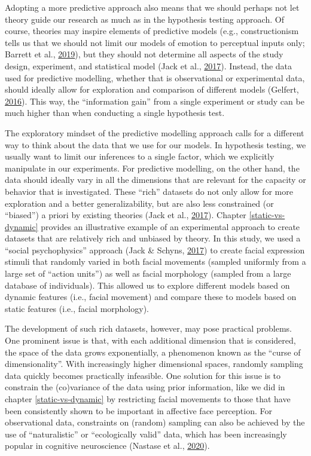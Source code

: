 \documentclass[11pt,american,]{memoir} %
\begin{document}
Adopting a more predictive approach also means that we should perhaps not let theory guide our research as much as in the hypothesis testing approach. Of course, theories may inspire elements of predictive models (e.g., constructionism tells us that we should not limit our models of emotion to perceptual inputs only; Barrett et al., \protect\hyperlink{ref-Barrett2019-bc}{2019}), but they should not determine all aspects of the study design, experiment, and statistical model (Jack et al., \protect\hyperlink{ref-Jack2017-qp}{2017}). Instead, the data used for predictive modelling, whether that is observational or experimental data, should ideally allow for exploration and comparison of different models (Gelfert, \protect\hyperlink{ref-Gelfert2016-hd}{2016}). This way, the ``information gain'' from a single experiment or study can be much higher than when conducting a single hypothesis test.

The exploratory mindset of the predictive modelling approach calls for a different way to think about the data that we use for our models. In hypothesis testing, we usually want to limit our inferences to a single factor, which we explicitly manipulate in our experiments. For predictive modelling, on the other hand, the data should ideally vary in all the dimensions that are relevant for the capacity or behavior that is investigated. These ``rich'' datasets do not only allow for more exploration and a better generalizability, but are also less constrained (or ``biased'') a priori by existing theories (Jack et al., \protect\hyperlink{ref-Jack2017-qp}{2017}). Chapter \ref{static-vs-dynamic} provides an illustrative example of an experimental approach to create datasets that are relatively rich and unbiased by theory. In this study, we used a ``social psychophysics'' approach (Jack \& Schyns, \protect\hyperlink{ref-Jack2017-gt}{2017}) to create facial expression stimuli that randomly varied in both facial movements (sampled uniformly from a large set of ``action units'') as well as facial morphology (sampled from a large database of individuals). This allowed us to explore different models based on dynamic features (i.e., facial movement) and compare these to models based on static features (i.e., facial morphology).

The development of such rich datasets, however, may pose practical problems. One prominent issue is that, with each additional dimension that is considered, the space of the data grows exponentially, a phenomenon known as the ``curse of dimensionality''. With increasingly higher dimensional spaces, randomly sampling data quickly becomes practically infeasible. One solution for this issue is to constrain the (co)variance of the data using prior information, like we did in chapter \ref{static-vs-dynamic} by restricting facial movements to those that have been consistently shown to be important in affective face perception. For observational data, constraints on (random) sampling can also be achieved by the use of ``naturalistic'' or ``ecologically valid'' data, which has been increasingly popular in cognitive neuroscience (Nastase et al., \protect\hyperlink{ref-Nastase2020-he}{2020}).
\end{document}
